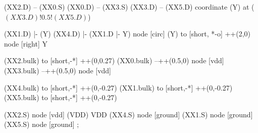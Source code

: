 \begin{circuitikz}[american]
	(XX2.D) -- (XX0.S)
	(XX0.D) -- (XX3.S)
	(XX3.D) -- (XX5.D)
	coordinate (Y) at ($(XX3.D)!0.5!(XX5.D)$)
		
	(XX1.D) |- (Y)
	(XX4.D) |- (XX1.D |- Y) node [circ] {}
	(Y) to [short, *-o] ++(2,0) node [right] {Y}
	
	(XX2.bulk) to [short,-*] ++(0,0.27)
	(XX0.bulk) --++(0.5,0) node [vdd] {}
	(XX3.bulk) --++(0.5,0) node [vdd] {}
	
	(XX4.bulk) to [short,-*] ++(0,-0.27)
	(XX1.bulk) to [short,-*] ++(0,-0.27)
	(XX5.bulk) to [short,-*] ++(0,-0.27)
	

	(XX2.S) node [vdd] (VDD) {VDD}
	(XX4.S) node [ground] {}
	(XX1.S) node [ground] {}
	(XX5.S) node [ground] {}
;

\end{circuitikz}

